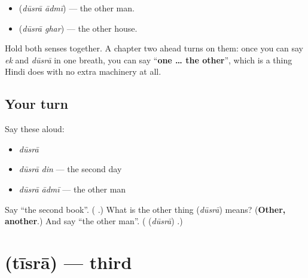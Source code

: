 \begin{itemize}
\raggedright
  \item \textbf{ } (\emph{dūsrā ādmī}) — the other man.
  \item \textbf{ } (\emph{dūsrā ghar}) — the other house.
\end{itemize}

Hold both senses together. A chapter two ahead turns on them: once you can say \emph{ek} and \emph{dūsrā} in one breath, you can say \textquotedblleft{}\textbf{one … the other}\textquotedblright{}, which is a thing Hindi does with no extra machinery at all.

\subsection*{Your turn}
Say these aloud:

\begin{itemize}
\raggedright
  \item \emph{dūsrā}
  \item \emph{dūsrā din} — the second day
  \item \emph{dūsrā ādmī} — the other man
\end{itemize}

\begin{tcolorbox}[breakable,colback=teal!4,colframe=teal!35!black,title={Before you move on}]
Say \textquotedblleft{}the second book\textquotedblright{}. (\textbf{ }.) What is the other thing \textbf{} (\emph{dūsrā}) means? (\textbf{Other, another}.) And say \textquotedblleft{}the other man\textquotedblright{}. (\textbf{} (\emph{dūsrā}) \textbf{}.)
\end{tcolorbox}
\section[\texorpdfstring{\hi{तीसरा} / \hi{तीसरी} (tīsrā / tīsrī)}{तीसरा / तीसरी (tīsrā / tīsrī)}]{ (tīsrā) — third}

\label{lesson:HI-C75-third}



